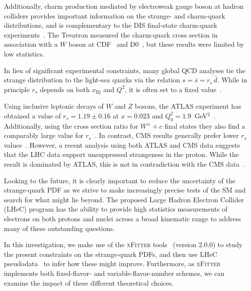 \documentclass[pdftex,twocolumn,epjc3]{svjour3}          %
\newcommand{\xfitter} {\textsc{xFitter}\xspace}
\newcommand{\xbj}{\ensuremath{x_{\text{Bj}}}\xspace}
\begin{document}
Additionally, charm production mediated by electroweak gauge boson at
hadron colliders provides important information on the strange- and 
charm-quark distributions, and is complementary to the DIS final-state
charm-quark experiments~\cite{Lai:2007dq}.
%
The Tevatron measured the charm-quark cross section in association
with a $W$ boson at CDF~\cite{Aaltonen:2007dm,Aaltonen:2012wn,Aaltonen:2015aka} and
D0~\cite{Abazov:2008qz}, but these results were limited by low
statistics.

In lieu of significant experimental constraints, many global QCD
analyses tie the strange distribution to the light-sea quarks via the
%
relation $s= \bar{s}=r_s \, \bar{d}$.
%
While in principle $r_s$ depends on both \xbj and $Q^2$, it is often
set to a fixed value~\cite{Kretzer:2003it, Martin:2004ir}.

Using inclusive leptonic decays of $W$ and $Z$ bosons, the ATLAS
experiment
has obtained a value of $r_s=1.19 \pm 0.16$  at
$x= 0.023$ and $Q^2_0 = 1.9$~GeV$^2$~\cite{Aaboud:2016btc}.
%
Additionally, using the cross section ratio for $W^\pm +c$ final
states they also find a comparably large value for $r_s$~\cite{Aad:2014xca}.
%
In contrast, CMS results generally prefer lower $r_s$
values~\cite{Chatrchyan:2013uja,Sirunyan:2018hde}.  However, a recent analysis using
both ATLAS and CMS data suggests that the LHC data support
unsuppressed strangeness in the proton. While the result is dominated
by ATLAS, this is not in contradiction with the CMS
data~\cite{Cooper-Sarkar:2018ufj,Aaboud:2016btc,Aad:2014xca,Chatrchyan:2013uja}.

Looking to the future, it is clearly important to reduce the
uncertainty of the strange-quark PDF as we strive to make increasingly
precise tests of the SM and search for what might lie beyond.
%
The proposed Large Hadron Electron Collider (LHeC) program has the
ability to provide high statistics measurements of electrons on both
protons and nuclei across a broad kinematic range to address many of
these outstanding questions.

In this investigation, we make use of the \xfitter
tools~\cite{Alekhin:2014irh} (version 2.0.0) to study the present constraints on the
strange-quark PDFs, and then use LHeC pseudodata~\cite{AbelleiraFernandez:2012cc} to infer how these
might improve. Furthermore, as \xfitter implements both fixed-flavor-
and variable-flavor-number schemes, we can examine the impact of these
different theoretical choices.

%
\end{document}
